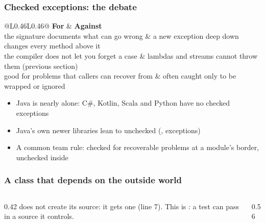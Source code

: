 \documentclass[aspectratio=169,10pt,compress]{beamer}
\begin{document}
\begin{frame}[t,fragile] \frametitle{Checked exceptions: the debate}


\begin{table}
		\footnotesize
		\begin{tabular}{@{}L{0.46\textwidth}L{0.46\textwidth}@{}}
			\toprule
			\textbf{For} & \textbf{Against} \\
			\midrule
			the signature documents what can go wrong       & a new exception deep down changes every method above it \\
			the compiler does not let you forget a case      & lambdas and streams cannot throw them (previous section) \\
			good for problems that callers can recover from & often caught only to be wrapped or ignored \\
			\bottomrule
		\end{tabular}
\end{table}%


	\vspace{0.4em}
	\begin{itemize}\small
		\item Java is nearly alone: C\#, Kotlin, Scala and Python have no checked exceptions
		\item Java's own newer libraries lean to unchecked (,  exceptions)
		\item A common team rule: checked for recoverable problems at a module's border, unchecked inside
	\end{itemize}
\end{frame}








\begin{frame}[t,fragile] \frametitle{A class that depends on the outside world}
	\begin{columns}[T]
		\begin{column}{0.42\textwidth}
			\footnotesize {} does not create its source: it gets one (line 7). This is :
			a test can pass in a source it controls.
		\end{column}
		\begin{column}{0.56\textwidth}
		\end{column}
	\end{columns}
\end{frame}
\end{document}
